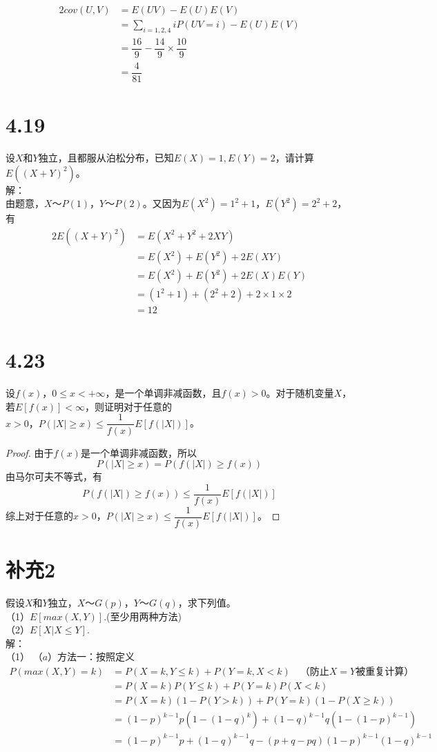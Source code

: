 \documentclass[a4papers]{ctexart}
\begin{document}
\begin{alignat*}{2}
 cov(U,V)&=E(UV)-E(U)E(V)\\
 &=\sum_{i=1,2,4}iP(UV=i)-E(U)E(V)\\
 &=\dfrac{16}{9}-\dfrac{14}{9}\times\dfrac{10}{9}\\
 &=\dfrac{4}{81}
\end{alignat*}
\section{4.19}
设$X$和$Y$独立，且都服从泊松分布，已知$E(X)=1,E(Y)=2$，请计算$E((X+Y)^2)$。\\
解：\\
由题意，$X～P(1)，Y～P(2)$。又因为$E(X^2)=1^2+1，E(Y^2)=2^2+2$，有
\begin{alignat*}{2}
    E((X+Y)^2)&=E(X^2+Y^2+2XY)\\
    &=E(X^2)+E(Y^2)+2E(XY)\\
    &=E(X^2)+E(Y^2)+2E(X)E(Y)\\
    &=(1^2+1)+(2^2+2)+2\times1\times2\\
    &=12\\
\end{alignat*}
\section{4.23}
    设$f(x)，0\le x < +\infty$，是一个单调非减函数，且$f(x)>0$。对于随机变量$X$，
若$E[f(x)]<\infty$，则证明对于任意的$x>0，P(|X|\ge x)\le \dfrac{1}{f(x)} E[f(|X|)]$。
\begin{proof}
由于$f(x)$是一个单调非减函数，所以\[P(|X|\ge x)=P(f(|X|)\ge f(x))\]
由马尔可夫不等式，有\[P(f(|X|)\ge f(x))\le \dfrac{1}{f(x)} E[f(|X|)]\]
综上对于任意的$x>0，P(|X|\ge x)\le \dfrac{1}{f(x)} E[f(|X|)]$。
\end{proof} %

\section{补充2}
假设$X$和$Y$独立，$X～G(p)，Y～G(q)$，求下列值。\\
（1）$E[max(X,Y)].$(至少用两种方法)\\
（2）$E[X|X\le Y].$\\
解：\\
（1）
（$a$）方法一：按照定义
\begin{align*}
    P(max(X,Y)=k)&=P(X=k,Y\le k)+P(Y=k,X< k)\quad（防止X=Y被重复计算）\\
    &=P(X=k)P(Y\le k)+P(Y=k)P(X < k)\\
    &=P(X=k)\left(1-P(Y > k)\right)+P(Y=k)\left(1-P(X\ge k)\right)\\
    &=(1-p)^{k-1}p(1-(1-q)^k)+(1-q)^{k-1}q(1-(1-p)^{k-1})\\
    &=(1-p)^{k-1}p+(1-q)^{k-1}q-(p+q-pq)(1-p)^{k-1}(1-q)^{k-1}
\end{align*}
\end{document}
